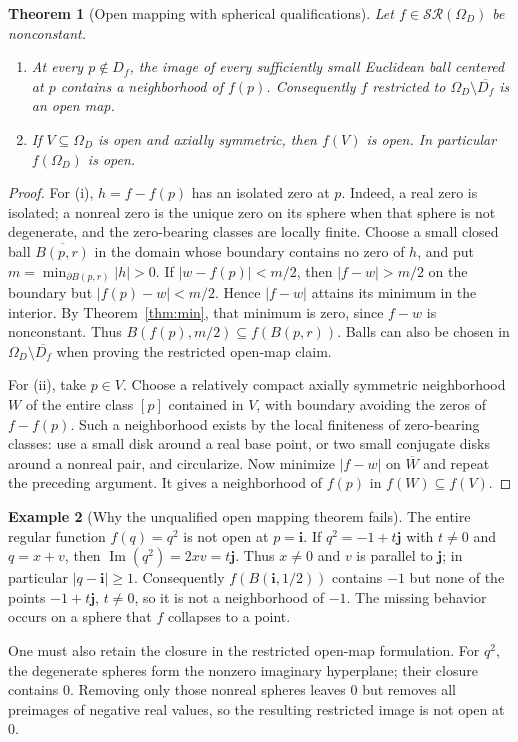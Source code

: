 \documentclass[11pt,a4paper]{article}
\numberwithin{equation}{section}
\newtheorem{theorem}{Theorem}[section]
\theoremstyle{definition}
\newtheorem{example}[theorem]{Example}
\theoremstyle{remark}
\newcommand{\ii}{\mathbf i}
\newcommand{\jj}{\mathbf j}
\newcommand{\Ima}{\operatorname{Im}}
\newcommand{\SR}{\mathcal{SR}}
\begin{document}
\begin{theorem}[Open mapping with spherical qualifications]
\label{thm:open}
Let $f\in\SR(\Omega_D)$ be nonconstant.
\begin{enumerate}[label=\textup{(\roman*)}]
\item At every $p\notin D_f$, the image of every sufficiently small Euclidean
ball centered at $p$ contains a neighborhood of $f(p)$.
Consequently $f$ restricted to $\Omega_D\setminus\overline{D_f}$ is an open
map.
\item If $V\subseteq\Omega_D$ is open and axially symmetric, then $f(V)$ is
open. In particular $f(\Omega_D)$ is open.
\end{enumerate}
\end{theorem}
\begin{proof}
For (i), $h=f-f(p)$ has an isolated zero at $p$. Indeed, a real zero is
isolated; a nonreal zero is the unique zero on its sphere when that sphere is
not degenerate, and the zero-bearing classes are locally finite.
Choose a small closed ball $\overline{B(p,r)}$ in the domain whose boundary
contains no zero of $h$, and put
$m=\min_{\partial B(p,r)}|h|>0$.
If $|w-f(p)|<m/2$, then $|f-w|>m/2$ on the boundary but
$|f(p)-w|<m/2$. Hence $|f-w|$ attains its minimum in the interior. By
Theorem~\ref{thm:min}, that minimum is zero, since $f-w$ is nonconstant.
Thus $B(f(p),m/2)\subseteq f(B(p,r))$. Balls can also be chosen in
$\Omega_D\setminus\overline{D_f}$ when proving the restricted open-map claim.

For (ii), take $p\in V$. Choose a relatively compact axially symmetric
neighborhood $W$ of the entire class $[p]$ contained in $V$, with boundary
avoiding the zeros of $f-f(p)$. Such a neighborhood exists by the local
finiteness of zero-bearing classes: use a small disk around a real base point,
or two small conjugate disks around a nonreal pair, and circularize.
Now minimize $|f-w|$ on $\overline W$ and repeat the preceding argument.
It gives a neighborhood of $f(p)$ in $f(W)\subseteq f(V)$.
\end{proof}

\begin{example}[Why the unqualified open mapping theorem fails]
The entire regular function $f(q)=q^2$ is not open at $p=\ii$.
If $q^2=-1+t\jj$ with $t\ne0$ and $q=x+v$, then
$\Ima(q^2)=2xv=t\jj$. Thus $x\ne0$ and $v$ is parallel to $\jj$;
in particular $|q-\ii|\ge1$.
Consequently $f(B(\ii,1/2))$ contains $-1$ but none of the points
$-1+t\jj$, $t\ne0$, so it is not a neighborhood of $-1$.
The missing behavior occurs on a sphere that $f$ collapses to a point.
\end{example}
One must also retain the closure in the restricted open-map formulation.
For $q^2$, the degenerate spheres form the nonzero imaginary hyperplane;
their closure contains $0$. Removing only those nonreal spheres leaves $0$
but removes all preimages of negative real values, so the resulting
restricted image is not open at $0$.
\end{document}
